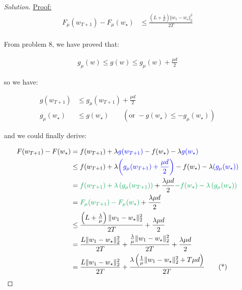 \documentclass{article}
\newenvironment{solution}
  {\renewcommand\qedsymbol{$\blacksquare$}\begin{proof}[Solution]}
  {\end{proof}}
\newenvironment{claimproof}[1]{\par\noindent\underline{Proof:}\space#1}{}
\begin{document}
\begin{solution}
\begin{claimproof}
        \begin{align*}
            F_\mu(w_{T+1}) - F_\mu(w_\star) 
            &\leq \frac{\left(L + \frac{\lambda}{\mu}\right) \Vert w_1 - w_\star \Vert^2_2}{2T} \\
        \end{align*}

        From problem $8$, we have proved that:

        \begin{align*}
            g_\mu(w) \leq g(w) \leq g_\mu(w) + \frac{\mu d}{2}
        \end{align*}

        so we have:

        \begin{align*}
            g(w_{T+1}) &\leq g_\mu(w_{T+1}) + \frac{\mu d}{2} \\
            g_\mu(w_\star) &\leq g(w_\star) \qquad (\text{or } -g(w_\star) \leq -g_\mu(w_\star))
        \end{align*}

        and we could finally derive:

        \begin{align*}
            F(w_{T+1}) - F(w_\star) 
            &= f(w_{T+1}) + \lambda \textcolor{blue}{g(w_{T+1})} - f(w_\star) - \lambda \textcolor{blue}{g(w_\star)} \\
            &\leq f(w_{T+1}) + \lambda \textcolor{blue}{\left(g_\mu(w_{T+1}) + \frac{\mu d}{2}\right)} - f(w_\star) - \lambda \textcolor{blue}{\left(g_\mu(w_\star)\right)} \\
            &= \textcolor{Green}{f(w_{T+1}) + \lambda \left(g_\mu(w_{T+1})\right)} + \frac{\lambda \mu d}{2} \textcolor{Green}{- f(w_\star) - \lambda \left(g_\mu(w_\star)\right)} \\
            &= \textcolor{Green}{F_\mu(w_{T+1}) - F_\mu(w_\star) } + \frac{\lambda \mu d}{2} \\
            &\leq \frac{\left(L + \frac{\lambda}{\mu}\right) \Vert w_1 - w_\star \Vert^2_2}{2T} + \frac{\lambda \mu d}{2} \\
            &= \frac{L \Vert w_1 - w_\star \Vert^2_2}{2T} + \frac{\frac{\lambda}{\mu} \Vert w_1 - w_\star \Vert^2_2}{2T} + \frac{\lambda \mu d}{2} \\
            &= \frac{L \Vert w_1 - w_\star \Vert^2_2}{2T} + \frac{\lambda \left( \frac{1}{\mu} \Vert w_1 - w_\star \Vert^2_2 + T \mu d \right)}{2T} \tag{*}
        \end{align*}


\end{claimproof}
\end{solution}
\end{document}
